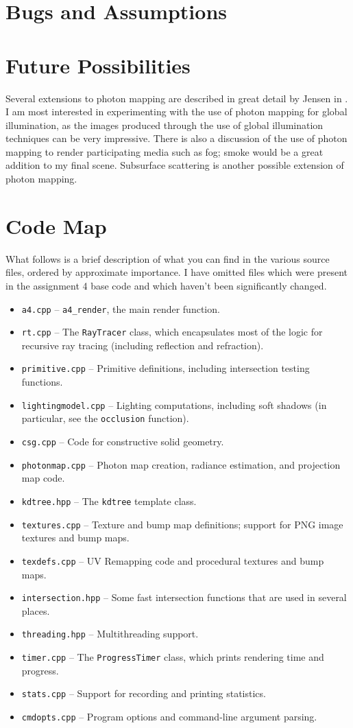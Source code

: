 \documentclass{article}
\begin{document}
\section{Bugs and Assumptions}


\section{Future Possibilities}

Several extensions to photon mapping are described in great detail by Jensen in
\cite{coursenotes}. I am most interested in experimenting with the use of photon
mapping for global illumination, as the images produced through the use of
global illumination techniques can be very impressive. There is also a discussion
of the use of photon mapping to render participating media such as fog; smoke would
be a great addition to my final scene. Subsurface scattering is another possible
extension of photon mapping.

\section{Code Map}

What follows is a brief description of what you can find in the various source
files, ordered by approximate importance. I have omitted files which were
present in the assignment 4 base code and which haven't been significantly
changed.

\newcommand{\cmditem}[1]{\item {\tt #1}}

\begin{itemize}
    \cmditem{a4.cpp} -- {\tt a4\_render}, the main render function.
    \cmditem{rt.cpp} -- The {\tt RayTracer} class, which encapsulates most of
    the logic for recursive ray tracing (including reflection and refraction).
    \cmditem{primitive.cpp} -- Primitive definitions, including intersection
    testing functions.
    \cmditem{lightingmodel.cpp} -- Lighting computations, including soft shadows
    (in particular, see the {\tt occlusion} function).
    \cmditem{csg.cpp} -- Code for constructive solid geometry.
    \cmditem{photonmap.cpp} -- Photon map creation, radiance estimation, and
    projection map code.
    \cmditem{kdtree.hpp} -- The {\tt kdtree} template class.
    \cmditem{textures.cpp} -- Texture and bump map definitions; support for
    PNG image textures and bump maps.
    \cmditem{texdefs.cpp} -- UV Remapping code and procedural textures and bump
    maps.
    \cmditem{intersection.hpp} -- Some fast intersection functions that are used
    in several places.
    \cmditem{threading.hpp} -- Multithreading support.
    \cmditem{timer.cpp} -- The {\tt ProgressTimer} class, which prints rendering
    time and progress.
    \cmditem{stats.cpp} -- Support for recording and printing statistics.
    \cmditem{cmdopts.cpp} -- Program options and command-line argument parsing.
\end{itemize}
\end{document}
